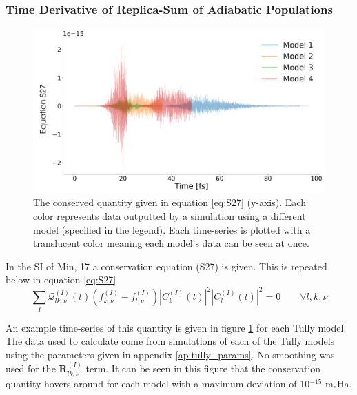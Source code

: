 \subsubsection{Time Derivative of Replica-Sum of Adiabatic Populations}
\begin{figure}[ht]
	\includegraphics[width=\textwidth]{../img/CTMQC/TullyModels/CTMQC_S27.png}
	\caption{\label{fig:S27}The conserved quantity given in equation \eqref{eq:S27} (y-axis). Each color represents data outputted by a simulation using a different model (specified in the legend). Each time-series is plotted with a translucent color meaning each model's data can be seen at once.}
\end{figure}

\noindent In the SI of Min, 17 \cite{min_ab_2017} a conservation equation (S27) is given. This is repeated below in equation \eqref{eq:S27}
\begin{equation}
	\sum_{I} \mathcal{Q}_{lk, \nu}^{(I)}(t) \left( f_{k, \nu}^{(I)} - f_{l, \nu}^{(I)} \right) |C_{k}^{(I)} (t)|^2 |C_{l}^{(I)} (t)|^2 = 0  \qquad \forall l, k, \nu
	\label{eq:S27}
\end{equation}

An example time-series of this quantity is given in figure \ref{fig:S27} for each Tully model. The data used to calculate come from simulations of each of the Tully models using the parameters given in appendix \ref{ap:tully_params}. No smoothing was used for the $\mathbf{R}_{lk, \nu}^{(I)}$ term. It can be seen in this figure that the conservation quantity hovers around  for each model with a maximum deviation of 10$^{-15}$ m$_{e}$Ha.

